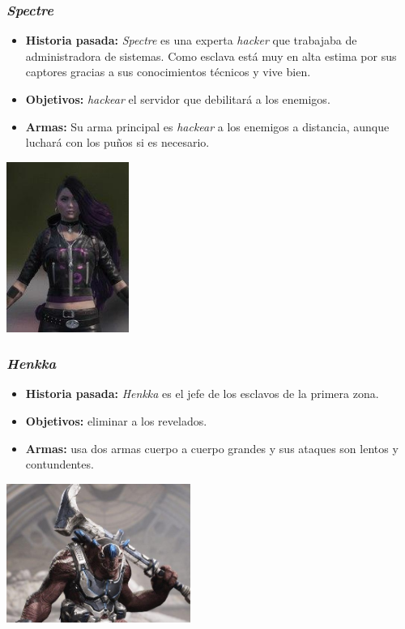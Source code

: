 \documentclass[11pt, twoside]{article}
\begin{document}
\subsubsection{\textit{Spectre}}
\begin{itemize}
\item \textbf{Historia pasada:} \textit{Spectre} es una experta \textit{hacker} que trabajaba de administradora de sistemas. Como esclava está muy en alta estima por sus captores gracias a sus conocimientos técnicos y vive bien. 
\item \textbf{Objetivos:} \textit{hackear} el servidor que debilitará a los enemigos.
\item \textbf{Armas:} Su arma principal es \textit{hackear} a los enemigos a distancia, aunque luchará con los puños si es necesario.
\end{itemize}

\begin{center}
\includegraphics[width=4cm]{./images/spectre.jpg}
\end{center}

\newpage
\subsubsection{\textit{Henkka}}
\begin{itemize}
\item \textbf{Historia pasada:} \textit{Henkka} es el jefe de los esclavos de la primera zona.
\item \textbf{Objetivos:} eliminar a los revelados.
\item \textbf{Armas:} usa dos armas cuerpo a cuerpo grandes y sus ataques son lentos y contundentes. 
\end{itemize}

\begin{center}
\includegraphics[width=6cm]{./images/henkka.jpg}
\end{center}
\end{document}
